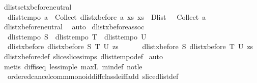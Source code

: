 \begin{isabellebody}
\endisatagproof
{\isafoldproof}%
%
\isadelimproof
\isanewline
%
\endisadelimproof
\isanewline
{}\isamarkupfalse%
\ dlistset{\isacharunderscore}xbefore{\isacharunderscore}neutral{\isacharunderscore}{}{\isacharcolon}\ \isanewline
\ \ {\isachardoublequoteopen}dlist{\isacharunderscore}tempo{}\ a\ {\isasymLongrightarrow}\ Collect\ {\isacharparenleft}dlist{\isacharunderscore}xbefore\ a\ {\isacharparenleft}{\isasymlambda}xs{\isachardot}\ xs\ {\isacharequal}\ Dlist\ {\isacharbrackleft}{\isacharbrackright}{\isacharparenright}{\isacharparenright}\ {\isacharequal}\ Collect\ a{\isachardoublequoteclose}\isanewline
%
\isadelimproof
%
\endisadelimproof
%
\isatagproof
{}\isamarkupfalse%
\ dlist{\isacharunderscore}xbefore{\isacharunderscore}neutral{\isacharunderscore}{}\ \isamarkupfalse%
\ auto%
\endisatagproof
{\isafoldproof}%
%
\isadelimproof
%
\endisadelimproof
%
\isamarkuptrue%
\isamarkupfalse%
\ dlist{\isacharunderscore}xbefore{\isacharunderscore}assoc{}{\isacharcolon}\ \isanewline
\ \ {\isachardoublequoteopen}dlist{\isacharunderscore}tempo{}\ S\ {\isasymLongrightarrow}\ dlist{\isacharunderscore}tempo{}\ T\ {\isasymLongrightarrow}\ dlist{\isacharunderscore}tempo{}\ U\ {\isasymLongrightarrow}\ \isanewline
\ \ {\isacharparenleft}dlist{\isacharunderscore}xbefore\ {\isacharparenleft}dlist{\isacharunderscore}xbefore\ S\ T{\isacharparenright}\ U\ zs{\isacharparenright}\ {\isasymlongleftrightarrow}\ \isanewline
\ \ \ \ {\isacharparenleft}dlist{\isacharunderscore}xbefore\ S\ {\isacharparenleft}dlist{\isacharunderscore}xbefore\ T\ U{\isacharparenright}\ zs{\isacharparenright}{\isachardoublequoteclose}\isanewline
%
\isadelimproof
%
\endisadelimproof
%
\isatagproof
{}\isamarkupfalse%
\ dlist{\isacharunderscore}xbefore{\isacharunderscore}def\ slice{\isacharunderscore}slice{\isacharunderscore}simps\ dlist{\isacharunderscore}tempo{\isacharunderscore}def\isanewline
{}\isamarkupfalse%
\ auto\isanewline
{}\isamarkupfalse%
\ {\isacharparenleft}metis\ diff{\isacharunderscore}is{\isacharunderscore}{}{\isacharunderscore}eq\ less{\isacharunderscore}imp{\isacharunderscore}le\ max{\isacharunderscore}{}L\ min{\isacharunderscore}def\ not{\isacharunderscore}le\ \isanewline
\ \ ordered{\isacharunderscore}cancel{\isacharunderscore}comm{\isacharunderscore}monoid{\isacharunderscore}diff{\isacharunderscore}class{\isachardot}le{\isacharunderscore}iff{\isacharunderscore}add\ slice{\isacharunderscore}dlist{\isacharunderscore}def\ \isanewline

\end{isabellebody}
